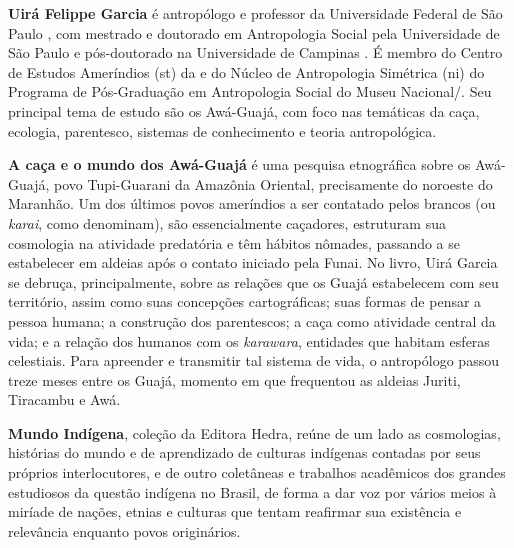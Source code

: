 \textbf{Uirá Felippe Garcia} é antropólogo e professor da Universidade Federal de São Paulo , com mestrado e doutorado em Antropologia Social pela Universidade de São Paulo  e pós-doutorado na Universidade de Campinas . É membro do Centro de Estudos Ameríndios (st) da  e do Núcleo de Antropologia Simétrica (ni) do Programa de Pós-Graduação em Antropologia Social do Museu Nacional/. Seu principal tema de estudo são os Awá-Guajá, com foco nas temáticas da caça, ecologia, parentesco, sistemas de conhecimento e teoria antropológica.

	
\textbf{A caça e o mundo dos Awá-Guajá} é uma pesquisa etnográfica sobre os Awá-Guajá, povo Tupi-Guarani da Amazônia Oriental, precisamente do noroeste do Maranhão. Um dos últimos povos ameríndios a ser contatado pelos brancos (ou \emph{karai}, como denominam), são essencialmente caçadores, estruturam sua cosmologia na atividade predatória e têm hábitos nômades, passando a se estabelecer em aldeias após o contato iniciado pela Funai. No livro, Uirá Garcia se debruça, principalmente, sobre as relações que os Guajá estabelecem com seu território, assim como suas concepções cartográficas; suas formas de pensar a pessoa humana; a construção dos parentescos; a caça como atividade central da vida; e a relação dos humanos com os \emph{karawara}, entidades que habitam esferas celestiais. Para apreender e transmitir tal sistema de vida, o antropólogo passou treze meses entre os Guajá, momento em que frequentou as aldeias Juriti, Tiracambu e Awá.


\textbf{Mundo Indígena}, coleção da Editora Hedra, reúne de um lado as cosmologias, histórias do mundo e de aprendizado de culturas indígenas contadas por seus próprios interlocutores, e de outro coletâneas e trabalhos acadêmicos dos grandes estudiosos da questão indígena no Brasil, de forma a dar voz por vários meios à miríade de nações, etnias e culturas que tentam reafirmar sua existência e relevância enquanto povos originários. 